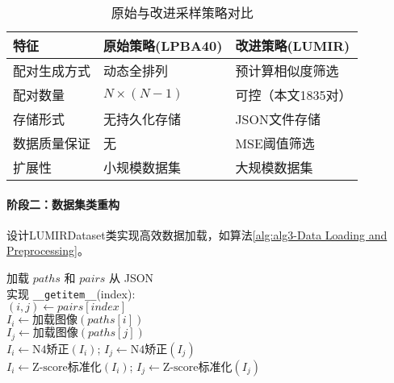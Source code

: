 \begin{table}[!h]
    \centering
    \caption{原始与改进采样策略对比}
    \label{tab1}
    \begin{tabular}{lll}
        \toprule
        \textbf{特征} & \textbf{原始策略(LPBA40)} & \textbf{改进策略(LUMIR)} \\
        \midrule
        配对生成方式      & 动态全排列                 & 预计算相似度筛选             \\
        配对数量        & $N \times (N-1)$      & 可控（本文1835对）          \\
        存储形式        & 无持久化存储                & JSON文件存储             \\
        数据质量保证      & 无                     & MSE阈值筛选              \\
        扩展性         & 小规模数据集                & 大规模数据集               \\
        \bottomrule
    \end{tabular}
\end{table}



\paragraph{阶段二：数据集类重构}
设计LUMIRDataset类实现高效数据加载，如算法\ref{alg:alg3-Data Loading and Preprocessing}。

\begin{algorithm}

    \label{alg:alg3-Data Loading and Preprocessing}

    加载 $paths$ 和 $pairs$ 从 JSON \\
    实现 \texttt{\_\_getitem\_\_}(index): \\
    \Indp
    $(i,j) \gets pairs[index]$ \\
    $I_i \gets \text{加载图像}(paths[i])$ \\
    $I_j \gets \text{加载图像}(paths[j])$ \\
    $I_i \gets \text{N4矫正}(I_i)$; $I_j \gets \text{N4矫正}(I_j)$ \\
    $I_i \gets \text{Z-score标准化}(I_i)$; $I_j \gets \text{Z-score标准化}(I_j)$ \\

\end{algorithm}


